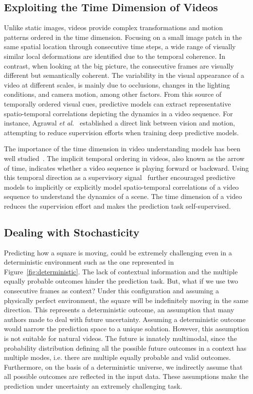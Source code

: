 \subsection{Exploiting the Time Dimension of Videos}
Unlike static images, videos provide complex transformations and motion patterns ordered in the time dimension. Focusing on a small image patch in the same spatial location through consecutive time steps, a wide range of visually similar local deformations are identified due to the temporal coherence. In contrast, when looking at the big picture, the consecutive frames are visually different but semantically coherent. The variability in the visual appearance of a video at different scales, is mainly due to occlusions, changes in the lighting conditions, and camera motion, among other factors. From this source of temporally ordered visual cues, predictive models can extract representative spatio-temporal correlations depicting the dynamics in a video sequence. For instance, Agrawal \textit{et al.}~\cite{Agrawal2015} established a direct link between vision and motion, attempting to reduce supervision efforts when training deep predictive models. 

The importance of the time dimension in video understanding models has been well studied~\cite{Huang2018}. The implicit temporal ordering in videos, also known as the arrow of time, indicates whether a video sequence is playing forward or backward. Using this temporal direction as a supervisory signal~\cite{Pickup2014,Misra2016,Wei2018} further encouraged predictive models to implicitly or explicitly model spatio-temporal correlations of a video sequence to understand the dynamics of a scene. The time dimension of a video reduces the supervision effort and makes the prediction task self-supervised.

\subsection{Dealing with Stochasticity}
Predicting how a square is moving, could be extremely challenging even in a deterministic environment such as the one represented in Figure~\ref{fig:deterministic}. The lack of contextual information and the multiple equally probable outcomes hinder the prediction task. But, what if we use two consecutive frames as context? Under this configuration and assuming a physically perfect environment, the square will be indefinitely moving in the same direction. This represents a deterministic outcome, an assumption that many authors made to deal with future uncertainty. Assuming a deterministic outcome would narrow the prediction space to a unique solution. However, this assumption is not suitable for natural videos. The future is innately multimodal, since the probability distribution defining all the possible future outcomes in a context has multiple modes, i.e. there are multiple equally probable and valid outcomes. Furthermore, on the basis of a deterministic universe, we indirectly assume that all possible outcomes are reflected in the input data. These assumptions make the prediction under uncertainty an extremely challenging task. 

